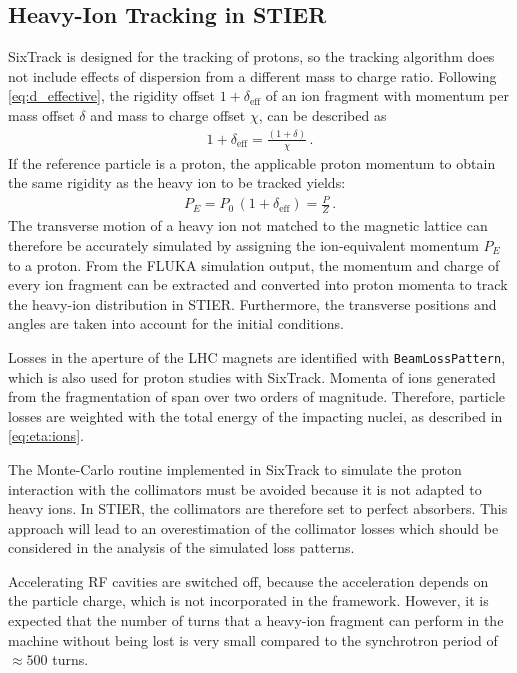 \subsection{Heavy-Ion Tracking in STIER}

SixTrack is designed for the tracking of protons, so the tracking algorithm does not include effects of dispersion from a different mass to charge ratio. Following \eqref{eq:d_effective}, the rigidity offset $1+\delta_\text{eff}$ of an ion fragment with momentum per mass offset $\delta$ and mass to charge offset $\chi$, can be described as
%
\begin{align}
1+\delta_\text{eff} = \frac{(1+\delta)}{\chi}  \,. 
\end{align}
%
If the reference particle is a proton, the applicable proton momentum to obtain the same rigidity as the heavy ion to be tracked yields:
\begin{align}
  P_E = P_0 \, (1+\delta_\text{eff}) = \frac{P}{Z} \, .
\end{align}
%
The transverse motion of a heavy ion not matched to the magnetic lattice can therefore be accurately simulated by assigning the ion-equivalent momentum $P_E$ to a proton. From the FLUKA simulation output, the momentum and charge of every ion fragment can be extracted and converted into proton momenta to track the heavy-ion distribution in STIER. Furthermore, the transverse positions and angles are taken into account for the initial conditions. 

\newpage
Losses in the aperture of the LHC magnets are identified with \texttt{BeamLossPattern}, which is also used for proton studies with SixTrack. Momenta of ions generated from the fragmentation of \lead span over two orders of magnitude. Therefore, particle losses are weighted with the total energy of the impacting nuclei, as described in \eqref{eq:eta:ions}.

The Monte-Carlo routine implemented in SixTrack to simulate the proton interaction with the collimators must be avoided because it is not adapted to heavy ions. In STIER, the collimators are therefore set to perfect absorbers. This approach will lead to an overestimation of the collimator losses which should be considered in the analysis of the simulated loss patterns. 

Accelerating RF cavities are switched off, because the acceleration depends on the particle charge, which is not incorporated in the framework. However, it is expected that the number of turns that a heavy-ion fragment can perform in the machine without being lost is very small compared to the synchrotron period of $\approx 500$ turns.




